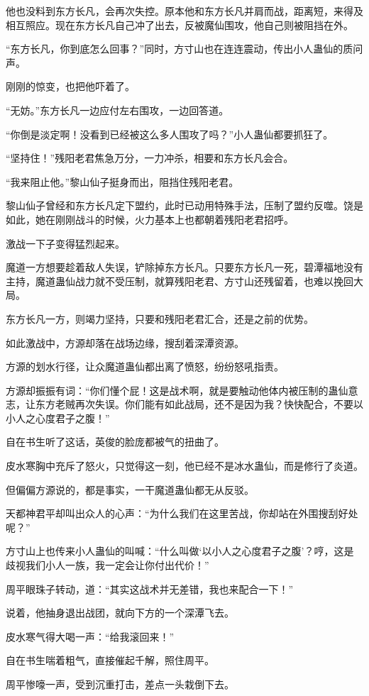 \begin{this_body}
他也没料到东方长凡，会再次失控。原本他和东方长凡并肩而战，距离短，来得及相互照应。现在东方长凡自己冲了出去，反被魔仙围攻，他自己则被阻挡在外。

“东方长凡，你到底怎么回事？”同时，方寸山也在连连震动，传出小人蛊仙的质问声。

刚刚的惊变，也把他吓着了。

“无妨。”东方长凡一边应付左右围攻，一边回答道。

“你倒是淡定啊！没看到已经被这么多人围攻了吗？”小人蛊仙都要抓狂了。

“坚持住！”残阳老君焦急万分，一力冲杀，相要和东方长凡会合。

“我来阻止他。”黎山仙子挺身而出，阻挡住残阳老君。

黎山仙子曾经和东方长凡定下盟约，此时已动用特殊手法，压制了盟约反噬。饶是如此，她在刚刚战斗的时候，火力基本上也都朝着残阳老君招呼。

激战一下子变得猛烈起来。

魔道一方想要趁着敌人失误，铲除掉东方长凡。只要东方长凡一死，碧潭福地没有主持，魔道蛊仙战力就不受压制，就算残阳老君、方寸山还残留着，也难以挽回大局。

东方长凡一方，则竭力坚持，只要和残阳老君汇合，还是之前的优势。

如此激战中，方源却落在战场边缘，搜刮着深潭资源。

方源的划水行径，让众魔道蛊仙都出离了愤怒，纷纷怒吼指责。

方源却振振有词：“你们懂个屁！这是战术啊，就是要触动他体内被压制的蛊仙意志，让东方老贼再次失误。你们能有如此战局，还不是因为我？快快配合，不要以小人之心度君子之腹！”

自在书生听了这话，英俊的脸庞都被气的扭曲了。

皮水寒胸中充斥了怒火，只觉得这一刻，他已经不是冰水蛊仙，而是修行了炎道。

但偏偏方源说的，都是事实，一干魔道蛊仙都无从反驳。

天都神君平却叫出众人的心声：“为什么我们在这里苦战，你却站在外围搜刮好处呢？”

方寸山上也传来小人蛊仙的叫喊：“什么叫做‘以小人之心度君子之腹’？哼，这是歧视我们小人一族，我一定会让你付出代价！”

周平眼珠子转动，道：“其实这战术并无差错，我也来配合一下！”

说着，他抽身退出战团，就向下方的一个深潭飞去。

皮水寒气得大喝一声：“给我滚回来！”

自在书生喘着粗气，直接催起千解，照住周平。

周平惨嚎一声，受到沉重打击，差点一头栽倒下去。


\end{this_body}
